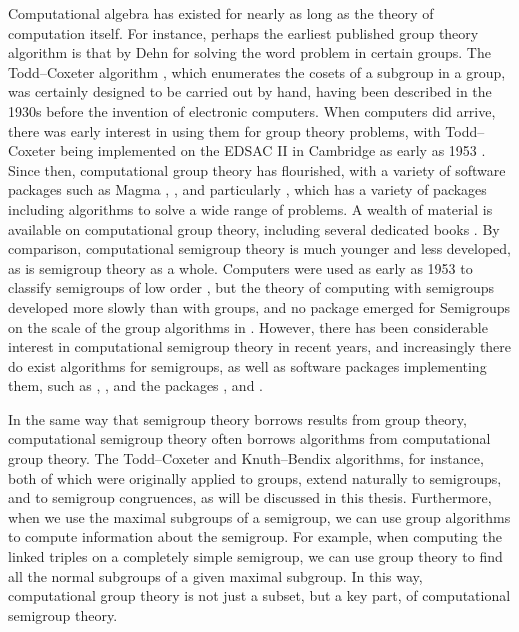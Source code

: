 Computational algebra has existed for nearly as long as the theory of
computation itself.  For instance, perhaps the earliest published group theory
algorithm is that by Dehn \cite{dehn_1911} for solving the word problem in
certain groups.  The Todd--Coxeter algorithm \cite{todd_coxeter_1936}, which
enumerates the cosets of a subgroup in a group, was certainly designed to be
carried out by hand, having been described in the 1930s before the invention of
electronic computers.  When computers did arrive, there was early interest in
using them for group theory problems, with Todd--Coxeter being implemented on
the EDSAC II in Cambridge as early as 1953 \cite{leech_1963}.  Since then,
computational group theory has flourished, with a variety of software packages
such as \textsf{Magma} \cite{magma}, \ACE{} \cite{ace}, and particularly \GAP{}
\cite{gap}, which has a variety of packages including algorithms to solve a wide
range of problems.  A wealth of material is available on computational group
theory, including several dedicated books \cite{sims, cgt}.  By comparison,
computational semigroup theory is much younger and less developed, as is
semigroup theory as a whole.  Computers were used as early as 1953 to classify
semigroups of low order \cite{tamura_1953, froidure_pin}, but the theory of
computing with semigroups developed more slowly than with groups, and no package
emerged for Semigroups on the scale of the group algorithms in \GAP{}.  However,
there has been considerable interest in computational semigroup theory in recent
years, and increasingly there do exist algorithms for semigroups, as well as
software packages implementing them, such as \Semigroupe{} \cite{semigroupe},
\libsemigroups{} \cite{libsemigroups}, and the \GAP{} packages \Semigroups{}
\cite{semigroups}, \smallsemi{} \cite{smallsemi} and \kbmag{} \cite{kbmag}.

In the same way that semigroup theory borrows results from group theory,
computational semigroup theory often borrows algorithms from computational group
theory.  The Todd--Coxeter and Knuth--Bendix algorithms, for instance, both of
which were originally applied to groups, extend naturally to semigroups, and to
semigroup congruences, as will be discussed in this thesis.  Furthermore, when
we use the maximal subgroups of a semigroup, we can use group algorithms to
compute information about the semigroup.  For example, when computing the
linked triples on a completely simple semigroup, we can use group theory to find
all the normal subgroups of a given maximal subgroup.  In this way,
computational group theory is not just a subset, but a key part, of
computational semigroup theory.

